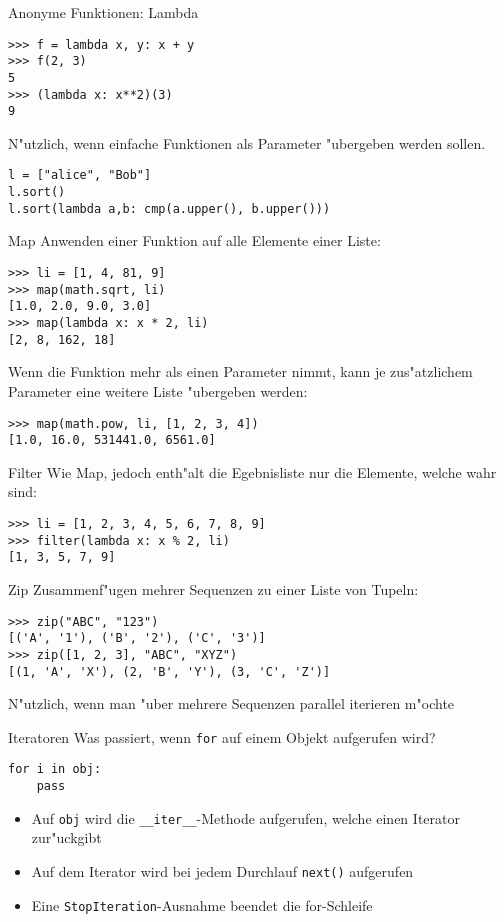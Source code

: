 \begin{frame}[fragile]{Anonyme Funktionen: Lambda}
\begin{lstlisting}[style=Shell]
>>> f = lambda x, y: x + y
>>> f(2, 3)
5
>>> (lambda x: x**2)(3)
9
\end{lstlisting}
N"utzlich, wenn einfache Funktionen als Parameter "ubergeben werden sollen.
\begin{lstlisting}[style=Python]
l = ["alice", "Bob"]
l.sort()
l.sort(lambda a,b: cmp(a.upper(), b.upper()))
\end{lstlisting}

\end{frame}

\begin{frame}[fragile]{Map}
Anwenden einer Funktion auf alle Elemente einer Liste:
\begin{lstlisting}[style=Shell]
>>> li = [1, 4, 81, 9]
>>> map(math.sqrt, li)
[1.0, 2.0, 9.0, 3.0]
>>> map(lambda x: x * 2, li)
[2, 8, 162, 18]
\end{lstlisting}
Wenn die Funktion mehr als einen Parameter nimmt, kann je zus"atzlichem Parameter eine weitere Liste "ubergeben werden:
\begin{lstlisting}[style=Shell]
>>> map(math.pow, li, [1, 2, 3, 4])
[1.0, 16.0, 531441.0, 6561.0]
\end{lstlisting}
\end{frame} 

\begin{frame}[fragile]{Filter}
Wie Map, jedoch enth"alt die Egebnisliste nur die Elemente, welche wahr sind:
\begin{lstlisting}[style=Shell]
>>> li = [1, 2, 3, 4, 5, 6, 7, 8, 9]
>>> filter(lambda x: x % 2, li)
[1, 3, 5, 7, 9]
\end{lstlisting}
\end{frame} 

\begin{frame}[fragile]{Zip}
Zusammenf"ugen mehrer Sequenzen zu einer Liste von Tupeln:
\begin{lstlisting}[style=Shell]
>>> zip("ABC", "123")
[('A', '1'), ('B', '2'), ('C', '3')]
>>> zip([1, 2, 3], "ABC", "XYZ")
[(1, 'A', 'X'), (2, 'B', 'Y'), (3, 'C', 'Z')]
\end{lstlisting}
N"utzlich, wenn man "uber mehrere Sequenzen parallel iterieren m"ochte
\end{frame}

\begin{frame}[fragile]{Iteratoren}
Was passiert, wenn \lstinline{for} auf einem Objekt aufgerufen wird?
\begin{lstlisting}[style=Python]
for i in obj:
    pass
\end{lstlisting}
\begin{itemize}
\item Auf \lstinline{obj} wird die \lstinline{__iter__}-Methode aufgerufen, welche einen \alert{Iterator} zur"uckgibt
\item Auf dem Iterator wird bei jedem Durchlauf \alert{\lstinline{next()}} aufgerufen
\item Eine \lstinline{StopIteration}-Ausnahme beendet die for-Schleife
\end{itemize}
\end{frame}

